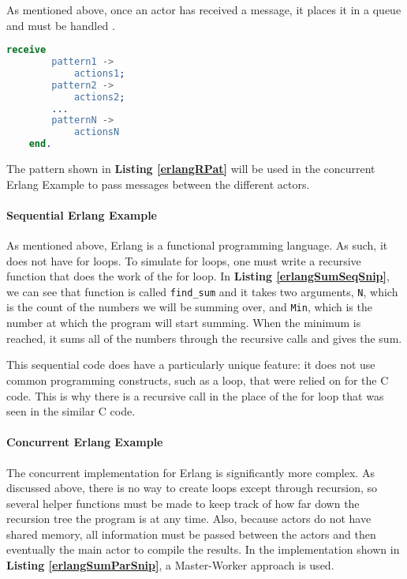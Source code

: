 \documentclass[12pt]{article}
\newcommand{\code}[1]{\lstinline[]{#1}}
\newcommand{\codeRef}[1]{\textbf{Listing \ref{#1}}}
\begin{document}
As mentioned above, once an actor has received a message, it places it in a queue and must be handled \cite{erlang_intro}.

\begin{lstlisting}[language=Erlang, caption="Erlang Receive Pattern", label=erlangRPat, captionpos=b, numbers=none ]
    receive
        pattern1 ->
            actions1;
        pattern2 ->
            actions2;
        ...
        patternN ->
            actionsN
    end.
\end{lstlisting}

The pattern shown in \codeRef{erlangRPat} will be used in the concurrent Erlang Example to pass messages between the different actors.

\paragraph{Sequential Erlang Example}

As mentioned above, Erlang is a functional programming language. As such, it does not have for loops. To simulate for loops, one must write a recursive function that does the work of the for loop. In \codeRef{erlangSumSeqSnip}, we can see that function is called \code{find_sum} and it takes two arguments, \code{N}, which is the count of the numbers we will be summing over, and \code{Min}, which is the number at which the program will start summing. When the minimum is reached, it sums all of the numbers through the recursive calls and gives the sum.



This sequential code does have a particularly unique feature:  it does not use common programming constructs, such as a loop, that were relied on for the C code. This is why there is a recursive call in the place of the for loop that was seen in the similar C code.

\paragraph{Concurrent Erlang Example}

The concurrent implementation for Erlang is significantly more complex. As discussed above, there is no way to create loops except through recursion, so several helper functions must be made to keep track of how far down the recursion tree the program is at any time. Also, because actors do not have shared memory, all information must be passed between the actors and then eventually the main actor to compile the results. In the implementation shown in \codeRef{erlangSumParSnip}, a Master-Worker approach is used.
\end{document}
